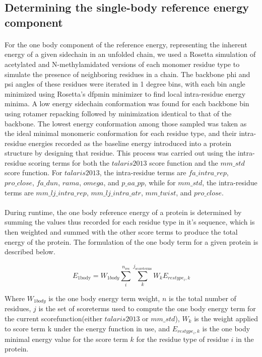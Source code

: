\subsection{Determining the single-body reference energy component}
\paragraph{}
For the one body component of the reference energy, representing the inherent energy of a given sidechain in an unfolded chain, we used a Rosetta simulation of acetylated and N-methylamidated versions of each monomer residue type to simulate the presence of neighboring residues in a chain.
The backbone phi and psi angles of these residues were iterated in 1 degree bins, with each bin angle minimized using Rosetta's dfpmin minimizer to find local intra-residue energy minima.
A low energy sidechain conformation was found for each backbone bin using rotamer repacking followed by minimization identical to that of the backbone.
The lowest energy conformation among those sampled was taken as the ideal minimal monomeric conformation for each residue type, and their intra-residue energies recorded as the baseline energy introduced into a protein structure by designing that residue.
This process was carried out using the intra-residue scoring terms for both the $talaris2013$ score function and the $mm\_std$ score function.
For $talaris2013$, the intra-residue terms are $fa\_intra\_rep$, $pro\_close$, $fa\_dun$, $rama$, $omega$, and $p\_aa\_pp$, while for $mm\_std$, the intra-residue terms are $mm\_lj\_intra\_rep$, $mm\_lj\_intra\_atr$, $mm\_twist$, and $pro\_close$.

\paragraph{}
During runtime, the one body reference energy of a protein is determined by summing the values thus recorded for each residue type in it's sequence, which is then weighted and summed with the other score terms to produce the total energy of the protein.
The formulation of the one body term for a given protein is described below.

\begin{equation}
E_{\text{1body}} = W_{1body} \sum_{i}^{n_{\text{res}}} \sum_{k}^{j_{\text{scoreterms}}} W_{k} E_{restype_{i},k}
\end{equation}

Where $W_{1body}$ is the one body energy term weight, $n$ is the total number of residues, $j$ is the set of scoreterms used to compute the one body energy term for the current scorefunction(either $talaris2013$ or $mm\_std$), $W_{k}$ is the weight applied to score term k under the energy function in use, and $E_{restype_{i},k}$ is the one body minimal energy value for the score term $k$ for the residue type of residue $i$ in the protein.



